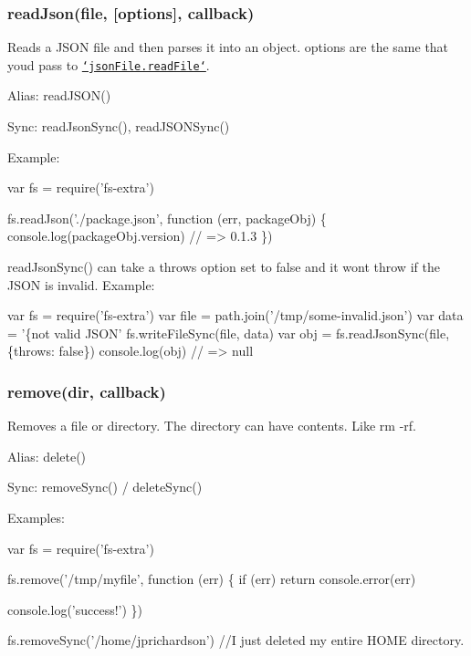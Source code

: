 \subsubsection*{read\+Json(file, \mbox{[}options\mbox{]}, callback)}

Reads a J\+S\+O\+N file and then parses it into an object. {\ttfamily options} are the same that you\textquotesingle{}d pass to \href{https://github.com/jprichardson/node-jsonfile#readfilefilename-options-callback}{\tt `json\+File.read\+File`}.

Alias\+: {\ttfamily read\+J\+S\+O\+N()}

Sync\+: {\ttfamily read\+Json\+Sync()}, {\ttfamily read\+J\+S\+O\+N\+Sync()}

Example\+:


\begin{DoxyCode}
var fs = require(\textcolor{stringliteral}{'fs-extra'})

fs.readJson('./package.json', function (err, packageObj) \{
  console.log(packageObj.version) \textcolor{comment}{// => 0.1.3}
\})
\end{DoxyCode}


{\ttfamily read\+Json\+Sync()} can take a {\ttfamily throws} option set to {\ttfamily false} and it won\textquotesingle{}t throw if the J\+S\+O\+N is invalid. Example\+:


\begin{DoxyCode}
var fs = require(\textcolor{stringliteral}{'fs-extra'})
var file = path.join('/tmp/some-invalid.json')
var data = '\{not valid JSON\textcolor{stringliteral}{'}
\textcolor{stringliteral}{fs.writeFileSync(file, data)}
\textcolor{stringliteral}{}
\textcolor{stringliteral}{var obj = fs.readJsonSync(file, \{throws: false\})}
\textcolor{stringliteral}{console.log(obj) // => null}
\end{DoxyCode}


\subsubsection*{remove(dir, callback)}

Removes a file or directory. The directory can have contents. Like {\ttfamily rm -\/rf}.

Alias\+: {\ttfamily delete()}

Sync\+: {\ttfamily remove\+Sync()} / {\ttfamily delete\+Sync()}

Examples\+:


\begin{DoxyCode}
var fs = require(\textcolor{stringliteral}{'fs-extra'})

fs.remove('/tmp/myfile', function (err) \{
  \textcolor{keywordflow}{if} (err) \textcolor{keywordflow}{return} console.error(err)

  console.log(\textcolor{stringliteral}{'success!'})
\})

fs.removeSync(\textcolor{stringliteral}{'/home/jprichardson'}) \textcolor{comment}{//I just deleted my entire HOME directory.}
\end{DoxyCode}


